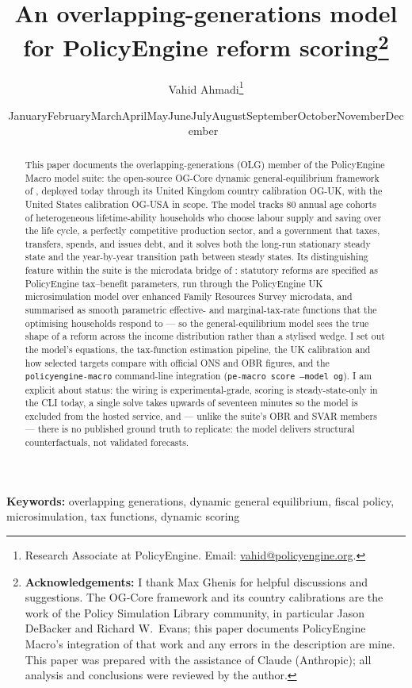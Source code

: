\documentclass[11pt]{article}
\title{\bfseries An overlapping-generations model for PolicyEngine reform scoring\thanks{\textbf{Acknowledgements:} I thank Max Ghenis for helpful discussions and suggestions. The OG-Core framework and its country calibrations are the work of the Policy Simulation Library community, in particular Jason DeBacker and Richard W.\ Evans; this paper documents PolicyEngine Macro's integration of that work and any errors in the description are mine. This paper was prepared with the assistance of Claude (Anthropic); all analysis and conclusions were reviewed by the author.}\\[0.7cm]}
\author{Vahid Ahmadi\thanks{Research Associate at PolicyEngine. Email: \href{mailto:vahid@policyengine.org}{vahid@policyengine.org}.}}
\date{\small \ifcase\month\or January\or February\or March\or April\or May\or June\or July\or August\or September\or October\or November\or December\fi\ \the\year}
\begin{document}
\maketitle

\begin{abstract}
\noindent This paper documents the overlapping-generations (OLG) member of the PolicyEngine Macro model suite: the open-source OG-Core dynamic general-equilibrium framework of \citet{DeBackerEvans2024}, deployed today through its United Kingdom country calibration OG-UK, with the United States calibration OG-USA in scope. The model tracks 80 annual age cohorts of heterogeneous lifetime-ability households who choose labour supply and saving over the life cycle, a perfectly competitive production sector, and a government that taxes, transfers, spends, and issues debt, and it solves both the long-run stationary steady state and the year-by-year transition path between steady states. Its distinguishing feature within the suite is the microdata bridge of \citet{DeBackerEvansPhillips2019}: statutory reforms are specified as PolicyEngine tax--benefit parameters, run through the PolicyEngine UK microsimulation model over enhanced Family Resources Survey microdata, and summarised as smooth parametric effective- and marginal-tax-rate functions that the optimising households respond to --- so the general-equilibrium model sees the true shape of a reform across the income distribution rather than a stylised wedge. I set out the model's equations, the tax-function estimation pipeline, the UK calibration and how selected targets compare with official ONS and OBR figures, and the \texttt{policyengine-macro} command-line integration (\texttt{pe-macro score --model og}). I am explicit about status: the wiring is experimental-grade, scoring is steady-state-only in the CLI today, a single solve takes upwards of seventeen minutes so the model is excluded from the hosted service, and --- unlike the suite's OBR and SVAR members --- there is no published ground truth to replicate: the model delivers structural counterfactuals, not validated forecasts.
\end{abstract}

\medskip
\noindent\textbf{Keywords:} overlapping generations, dynamic general equilibrium, fiscal policy, microsimulation, tax functions, dynamic scoring

\newpage













\end{document}

